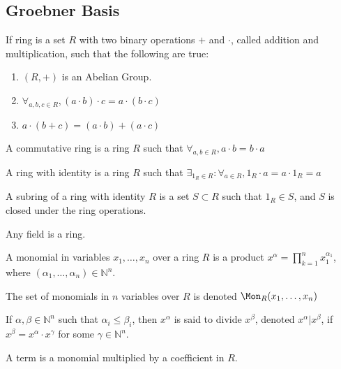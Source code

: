 \documentclass[crop=false,class=book,oneside]{standalone}
\begin{document}
\subsection{Groebner Basis}
\begin{definition}
If ring is a set $R$ with two binary operations $+$ and $\cdot$, called addition and multiplication, such that the following are true:
\begin{enumerate}
    \item $(R,+)$ is an Abelian Group.
    \item $\forall_{a,b,c\in R}, (a\cdot b)\cdot c = a\cdot(b\cdot c)$
    \item $a\cdot(b+c) = (a\cdot b)+(a\cdot c)$
\end{enumerate}
\end{definition}
\begin{definition}
A commutative ring is a ring $R$ such that $\forall_{a,b\in R}, a\cdot b=b\cdot a$
\end{definition}
\begin{definition}
A ring with identity is a ring $R$ such that $\exists_{1_{R}\in R}:\forall_{a\in R}, 1_{R}\cdot a=a\cdot 1_{R}=a$
\end{definition}
\begin{definition}
A subring of a ring with identity $R$ is a set $S\subset R$ such that $1_{R}\in S$, and $S$ is closed under the ring operations.
\end{definition}
\begin{remark}
Any field is a ring.
\end{remark}
\begin{definition}
A monomial in variables $x_1,\hdots, x_n$ over a ring $R$ is a product $x^\alpha = \prod_{k=1}^{n} x_1^{\alpha_1}$, where $(\alpha_1,\hdots, \alpha_n)\in \mathbb{N}^n$.
\end{definition}
\begin{notation}
The set of monomials in $n$ variables over $R$ is denoted $\Mon_{R}(x_1,\hdots, x_n)$
\end{notation}
\begin{definition}
If $\alpha,\beta \in \mathbb{N}^n$ such that $\alpha_i \leq \beta_i$, then $x^{\alpha}$ is said to divide $x^\beta$, denoted $x^\alpha \vert x^\beta$, if $x^\beta = x^\alpha \cdot x^\gamma$ for some $\gamma \in \mathbb{N}^n$.
\end{definition}
\begin{definition}
A term is a monomial multiplied by a coefficient in $R$.
\end{definition}
\end{document}
